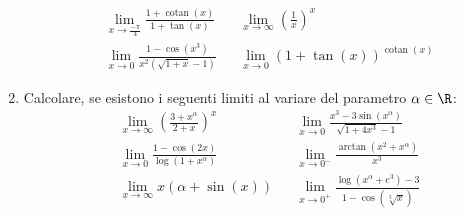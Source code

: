 \begin{enumerate}
\begin{align*}
		       & \lim_{x \to \frac{-\pi}{4}} \frac{1 + \operatorname{cotan} \left(x\right)}{1 + \tan \left(x\right)} &  & \lim_{x \to \infty} \left(\frac{1}{x}\right)^{x}                                                                        \\
		       & \lim_{x \to 0} \frac{1 - \cos \left(x^3 \right)}{x^2  \left(\sqrt{1 + x} -1\right)}                 &  & \lim_{x \to 0} \left(1 + \tan \left(x\right)\right)^{ \operatorname{cotan}\left(x\right)}
	      \end{align*}
	\item Calcolare, se esistono i seguenti limiti al variare del parametro $ \alpha  \in  \R  $:
	      \begin{align*}
		       & \lim_{x \to \infty} \left(\frac{3 + x^{\alpha }}{2 + x}\right)^{x}             &  & \lim_{x \to 0} \frac{x^3  - 3 \sin \left(x^{\alpha }\right)}{\sqrt{1 + 4x^3 } -1}                       \\
		       & \lim_{x \to 0} \frac{1-\cos \left(2x\right)}{\log \left(1+ x^{\alpha }\right)} &  & \lim_{x \to 0^{-}} \frac{\arctan \left(x^2  + x^{\alpha }\right)}{x^3}                                  \\
		       & \lim_{x \to \infty} x\left(\alpha  + \sin  \left(x\right)\right)               &  & \lim_{x \to 0^{+}} \frac{\log  \left(x^{\alpha } + e^3 \right) - 3}{1 - \cos  \left(\sqrt[3]{x}\right)}
	      \end{align*}
\end{enumerate}
